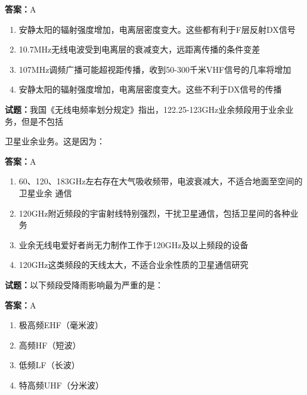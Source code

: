 \documentclass{ctexbook}
\begin{document}
\textbf{答案：}A 

\begin{enumerate}[leftmargin=3em]
  \item 安静太阳的辐射强度增加，电离层密度变大。这些都有利于F层反射DX信号 

  \item 10.7MHz无线电波受到电离层的衰减变大，远距离传播的条件变差 

  \item 107MHz调频广播可能超视距传播，收到50-300千米VHF信号的几率将增加 

  \item 安静太阳的辐射强度增加，电离层密度变大。这些不利于DX信号的传播 

\end{enumerate}





\vspace{1em}

\textbf{试题：}我国《无线电频率划分规定》指出，122.25-123GHz业余频段用于业余业务，但是不包括


卫星业余业务。这是因为： 

\textbf{答案：}A 

\begin{enumerate}[leftmargin=3em]
  \item 60、120、183GHz左右存在大气吸收频带，电波衰减大，不适合地面至空间的卫星业余
通信 

  \item 120GHz附近频段的宇宙射线特别强烈，干扰卫星通信，包括卫星间的各种业务 

  \item 业余无线电爱好者尚无力制作工作于120GHz及以上频段的设备 

  \item 120GHz这类频段的天线太大，不适合业余性质的卫星通信研究 

\end{enumerate}





\vspace{1em}

\textbf{试题：}以下频段受降雨影响最为严重的是： 

\textbf{答案：}A 

\begin{enumerate}[leftmargin=3em]
  \item 极高频EHF（毫米波） 

  \item 高频HF（短波） 

  \item 低频LF（长波） 

  \item 特高频UHF（分米波） 

\end{enumerate}
\end{document}
